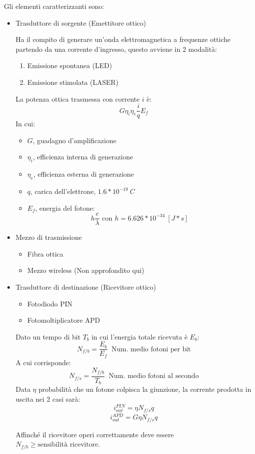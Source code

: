 \documentclass{article}
\begin{document}
\noindent Gli elementi caratterizzanti sono:
\begin{itemize}
    \item Trasduttore di sorgente (Emettitore ottico)

        Ha il compito di generare un'onda elettromagnetica a frequenze ottiche partendo da una corrente d'ingresso, questo avviene in 2 modalità:
            \begin{enumerate}
                \item Emissione spontanea (LED)
                \item Emissione stimolata (LASER)\newline
            \end{enumerate}

        La potenza ottica trasmessa con corrente $i$ è:
        $$G\eta_i\eta_e\frac{i}{q}E_f$$
        \noindent In cui:
        \begin{itemize}
            \item $G$, guadagno d'amplificazione
            \item $\eta_i$, efficienza interna di generazione
            \item $\eta_e$, efficienza esterna di generazione
            \item $q$, carica dell'elettrone, $1.6*10^{-19}\ C$
            \item $E_f$, energia del fotone:
            $$h\frac{c}{\lambda}\text{ con } h=6.626*10^{-34}\ [J*s]$$
        \end{itemize}
        
    \item Mezzo di trasmissione
        \begin{itemize}
            \item Fibra ottica
            \item Mezzo wireless (Non approfondito qui)
        \end{itemize}
    \item Trasduttore di destinazione (Ricevitore ottico)
        \begin{itemize}
            \item Fotodiodo PIN
            \item Fotomoltiplicatore APD\newline
        \end{itemize}

        Dato un tempo di bit $T_b$ in cui l'energia totale ricevuta è $E_b$:
        $$N_{f/b}=\frac{E_b}{E_f}\ \text{ Num. medio fotoni per bit}$$
        \noindent A cui corrisponde:
        $$N_{f/s}=\frac{N_{f/b}}{T_b}\ \text{ Num. medio fotoni al secondo}$$
        \noindent Data $\eta$ probabilità che un fotone colpisca la giunzione, la corrente prodotta in uscita nei 2 casi sarà:
                $$i_{out}^{PIN}=\eta N_{f/s}q$$
                $$i_{out}^{APD}=G\eta N_{f/s}q$$\newline

        \noindent Affinché il ricevitore operi correttamente deve essere $N_{f/b}\geq \text{sensibilità ricevitore}$.\newline
        
\end{itemize}
\end{document}
